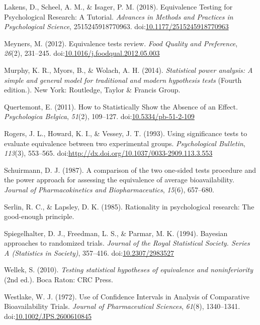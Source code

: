\documentclass[,man,floatsintext]{apa6}
\begin{document}
\leavevmode\hypertarget{ref-lakens_equivalence_2018}{}%
Lakens, D., Scheel, A. M., \& Isager, P. M. (2018). Equivalence Testing for Psychological Research: A Tutorial. \emph{Advances in Methods and Practices in Psychological Science}, 2515245918770963. doi:\href{https://doi.org/10.1177/2515245918770963}{10.1177/2515245918770963}

\leavevmode\hypertarget{ref-meyners_equivalence_2012}{}%
Meyners, M. (2012). Equivalence tests review. \emph{Food Quality and Preference}, \emph{26}(2), 231--245. doi:\href{https://doi.org/10.1016/j.foodqual.2012.05.003}{10.1016/j.foodqual.2012.05.003}

\leavevmode\hypertarget{ref-murphy_statistical_2014}{}%
Murphy, K. R., Myors, B., \& Wolach, A. H. (2014). \emph{Statistical power analysis: A simple and general model for traditional and modern hypothesis tests} (Fourth edition.). New York: Routledge, Taylor \& Francis Group.

\leavevmode\hypertarget{ref-quertemont_how_2011}{}%
Quertemont, E. (2011). How to Statistically Show the Absence of an Effect. \emph{Psychologica Belgica}, \emph{51}(2), 109--127. doi:\href{https://doi.org/10.5334/pb-51-2-109}{10.5334/pb-51-2-109}

\leavevmode\hypertarget{ref-rogers_using_1993}{}%
Rogers, J. L., Howard, K. I., \& Vessey, J. T. (1993). Using significance tests to evaluate equivalence between two experimental groups. \emph{Psychological Bulletin}, \emph{113}(3), 553--565. doi:\href{https://doi.org/http://dx.doi.org/10.1037/0033-2909.113.3.553}{http://dx.doi.org/10.1037/0033-2909.113.3.553}

\leavevmode\hypertarget{ref-schuirmann_comparison_1987}{}%
Schuirmann, D. J. (1987). A comparison of the two one-sided tests procedure and the power approach for assessing the equivalence of average bioavailability. \emph{Journal of Pharmacokinetics and Biopharmaceutics}, \emph{15}(6), 657--680.

\leavevmode\hypertarget{ref-serlin_rationality_1985}{}%
Serlin, R. C., \& Lapsley, D. K. (1985). Rationality in psychological research: The good-enough principle.

\leavevmode\hypertarget{ref-spiegelhalter_bayesian_1994}{}%
Spiegelhalter, D. J., Freedman, L. S., \& Parmar, M. K. (1994). Bayesian approaches to randomized trials. \emph{Journal of the Royal Statistical Society. Series A (Statistics in Society)}, 357--416. doi:\href{https://doi.org/10.2307/2983527}{10.2307/2983527}

\leavevmode\hypertarget{ref-wellek_testing_2010}{}%
Wellek, S. (2010). \emph{Testing statistical hypotheses of equivalence and noninferiority} (2nd ed.). Boca Raton: CRC Press.

\leavevmode\hypertarget{ref-westlake_use_1972}{}%
Westlake, W. J. (1972). Use of Confidence Intervals in Analysis of Comparative Bioavailability Trials. \emph{Journal of Pharmaceutical Sciences}, \emph{61}(8), 1340--1341. doi:\href{https://doi.org/10.1002/JPS.2600610845}{10.1002/JPS.2600610845}
\end{document}
